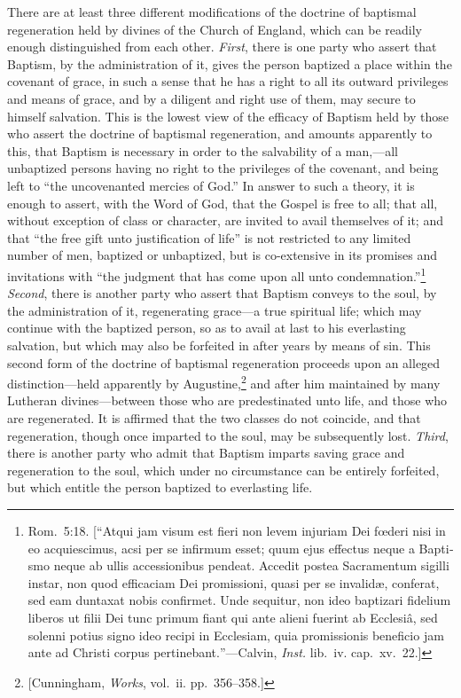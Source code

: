 \documentclass[
]{book}
\begin{document}
There are at least three different modifications of the doctrine of baptismal regeneration held by divines of the Church of England, which can be readily enough distinguished from each other. \emph{First}, there is one party who assert that Baptism, by the administration of it, gives the person baptized a place within the covenant of grace, in such a sense that he has a right to all its outward privileges and means of grace, and by a diligent and right use of them, may secure to himself salvation. This is the lowest view of the efficacy of Baptism held by those who assert the doctrine of baptismal regeneration, and amounts apparently to this, that Baptism is necessary in order to the salvability of a man,---all unbaptized persons having no right to the privileges of the covenant, and being left to ``the uncovenanted mercies of God.'' In answer to such a theory, it is enough to assert, with the Word of God, that the Gospel is free to all; that all, without exception of class or character, are invited to avail themselves of it; and that ``the free gift unto justification of life'' is not restricted to any limited number of men, baptized or unbaptized, but is co-extensive in its promises and invitations with ``the judgment that has come upon all unto condemnation.''\footnote{Rom.~5:18. {[}``\foreignlanguage{latin}{Atqui jam visum est fieri non levem injuriam Dei fœderi nisi in eo acquiescimus, acsi per se infirmum esset; quum ejus effectus neque a Baptismo neque ab ullis accessionibus pendeat. Accedit postea Sacramentum sigilli instar, non quod efficaciam Dei promissioni, quasi per se invalidæ, conferat, sed eam duntaxat nobis confirmet. Unde sequitur, non ideo baptizari fidelium liberos ut filii Dei tunc primum fiant qui ante alieni fuerint ab Ecclesiâ, sed solenni potius signo ideo recipi in Ecclesiam, quia promissionis beneficio jam ante ad Christi corpus pertinebant.}''---Calvin, \emph{Inst.} lib.~iv. cap.~xv.~22.{]}} \emph{Second}, there is another party who assert that Baptism conveys to the soul, by the administration of it, regenerating grace---a true spiritual life; which may continue with the baptized person, so as to avail at last to his everlasting salvation, but which may also be forfeited in after years by means of sin. This second form of the doctrine of baptismal regeneration proceeds upon an alleged distinction---held apparently by Augustine,\footnote{{[}Cunningham, \emph{Works}, vol.~ii. pp.~356--358.{]}} and after him maintained by many Lutheran divines---between those who are predestinated unto life, and those who are regenerated. It is affirmed that the two classes do not coincide, and that regeneration, though once imparted to the soul, may be subsequently lost. \emph{Third}, there is another party who admit that Baptism imparts saving grace and regeneration to the soul, which under no circumstance can be entirely forfeited, but which entitle the person baptized to everlasting life.
\end{document}
